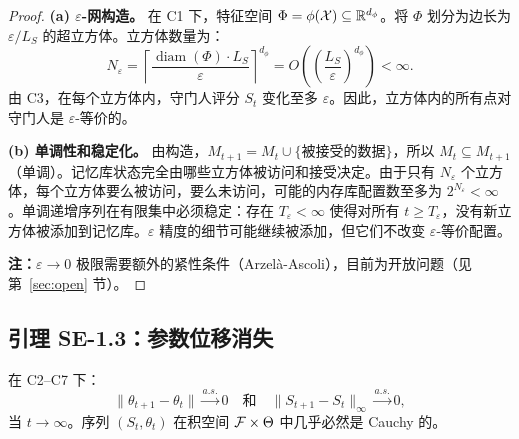 \begin{proof}
\textbf{(a) $\varepsilon$-网构造。} 在 C1 下，特征空间 $\Phi = \phi(\mathcal{X}) \subseteq \mathbb{R}^{d_\phi}$。将 $\Phi$ 划分为边长为 $\varepsilon/L_S$ 的超立方体。立方体数量为：
\begin{equation}
    N_\varepsilon = \left\lceil\frac{\operatorname{diam}(\Phi) \cdot L_S}{\varepsilon}\right\rceil^{d_\phi} = O\left(\left(\frac{L_S}{\varepsilon}\right)^{d_\phi}\right) < \infty.
\end{equation}
由 C3，在每个立方体内，守门人评分 $S_t$ 变化至多 $\varepsilon$。因此，立方体内的所有点对守门人是 $\varepsilon$-等价的。

\textbf{(b) 单调性和稳定化。} 由构造，$M_{t+1} = M_t \cup \{\text{被接受的数据}\}$，所以 $M_t \subseteq M_{t+1}$（单调）。记忆库状态完全由哪些立方体被访问和接受决定。由于只有 $N_\varepsilon$ 个立方体，每个立方体要么被访问，要么未访问，可能的内存库配置数至多为 $2^{N_\varepsilon} < \infty$。单调递增序列在有限集中必须稳定：存在 $T_\varepsilon < \infty$ 使得对所有 $t \geq T_\varepsilon$，没有新立方体被添加到记忆库。$\varepsilon$ 精度的细节可能继续被添加，但它们不改变 $\varepsilon$-等价配置。

\textbf{注：}$\varepsilon \to 0$ 极限需要额外的紧性条件（Arzel\`{a}-Ascoli），目前为开放问题（见第~\ref{sec:open} 节）。
\end{proof}

\subsection{引理 SE-1.3：参数位移消失}

\begin{lemma}[消失的参数位移]\label{lem:displacement}
在 C2--C7 下：
\begin{equation}
    \|\theta_{t+1} - \theta_t\| \xrightarrow{a.s.} 0 \quad \text{和} \quad \|S_{t+1} - S_t\|_\infty \xrightarrow{a.s.} 0,
\end{equation}
当 $t \to \infty$。序列 $(S_t, \theta_t)$ 在积空间 $\mathcal{F} \times \Theta$ 中几乎必然是 Cauchy 的。
\end{lemma}

